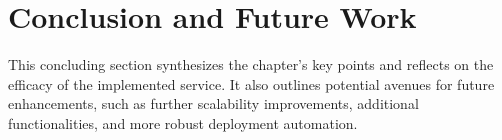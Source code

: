 
\section{Conclusion and Future Work}
This concluding section synthesizes the chapter’s key points and reflects on the efficacy of the implemented service. It also outlines potential avenues for future enhancements, such as further scalability improvements, additional functionalities, and more robust deployment automation.





